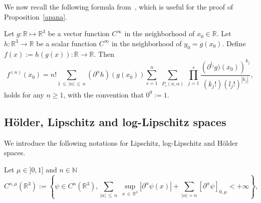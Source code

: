 \documentclass[AHL,Unicode,longabstracts,published]{cedram}
\newcommand{\R}{\mathbb{R}}
\newcommand{\N}{\mathbb{N}}
\renewcommand{\leq}{\leqslant}
\renewcommand{\geq}{\geqslant}
\begin{document}
We now recall the following formula from~\cite[Lemma~3.2]{CVW}, which is useful for the proof of Proposition~\ref{apana}.


\begin{lemm}\label{Lemme_FDB}
Let $g:\R \mapsto \R^3$ be a vector function $ C^\infty$ in the neighborhood of $x_0 \in \R$. Let $h : \R^3 \to \R$ be a scalar function $ C^\infty$ in the neighborhood of $y_0=g(x_0)$. Define $f(x):=h(g(x)): \R \to \R$. Then
\begin{equation}\label{FDB_formula}
f^{(n)}(x_0)= n! \sum_{1\,\leq\,|\alpha|\,\leq\,n} (\partial^\alpha h)(g(x_0))
\sum^n_{s=1}\;\sum_{P_s(n,\alpha)}\;\prod^s_{j=1}
\frac{\left(\partial^{l_j} g)(x_0)\right)^{k_j}}{(k_j!) (l_j!)^{|k_j|}},
\end{equation}
holds for any $n\geq 1$, with the convention that $0^0:=1$.
\end{lemm}

\subsection{H\"older, Lipschitz and log-Lipschitz spaces} We introduce the following notations for Lipschitz, log-Lipschitz and H\"older spaces.
\begin{defi}
Let $ \mu \in]0,1]$ and $n\in \N $
\[
C^{n,\mu}\left(\R^3\right):= \left\{ \psi \in C^n(\R^3), \sum_{|\alpha|\,\leq\,n}\;
\underset{x\,\in\,\R^3}{\sup}\left|\partial^\alpha \psi(x)\right|+
\sum_{|\alpha|= n}[\partial^\alpha \psi]_{0,\mu}<+\infty \right\},
\]
\end{defi}
\end{document}
